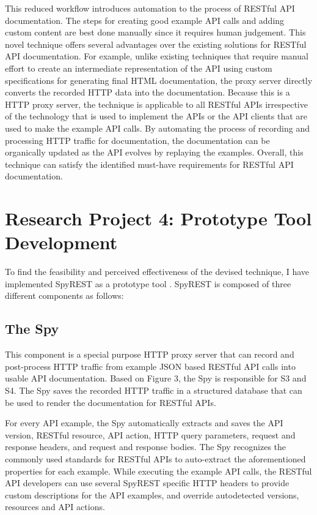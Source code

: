 \documentclass[11pt,oneside]{book}
\begin{document}
This reduced workflow introduces automation to the process of RESTful API documentation. The steps for creating good example API calls and adding custom content are best done manually since it requires human judgement. This novel technique offers several advantages over the existing solutions for RESTful API documentation. For example, unlike existing techniques that require manual effort to create an intermediate representation of the API using custom specifications for generating final HTML documentation, the proxy server directly converts the recorded HTTP data into the documentation. Because this is a HTTP proxy server, the technique is applicable to all RESTful APIs irrespective of the technology that is used to implement the APIs or the API clients that are used to make the example API calls. By automating the process of recording and processing HTTP traffic for documentation, the documentation can be organically updated as the API evolves by replaying the examples. Overall, this technique can satisfy the identified must-have requirements for RESTful API documentation.

\section{Research Project 4: Prototype Tool Development}

To find the feasibility and perceived effectiveness of the devised technique, I have implemented SpyREST as a prototype tool \cite{sohan2015spyrest_tool}. SpyREST is composed of three different components as follows:

\subsection{The Spy}
This component is a special purpose HTTP proxy server that can record and post-process HTTP traffic from example JSON based RESTful API calls into usable API documentation. Based on Figure 3, the Spy is responsible for S3 and S4. The Spy saves the recorded HTTP traffic in a structured database that can be used to render the documentation for RESTful APIs.

For every API example, the Spy automatically extracts and saves the API version, RESTful resource, API action, HTTP query parameters, request and response headers, and request and response bodies. The Spy recognizes the commonly used standards for RESTful APIs to auto-extract the aforementioned properties for each example. While executing the example API calls, the RESTful API developers can use several SpyREST specific HTTP headers to provide custom descriptions for the API examples, and override autodetected versions, resources and API actions.
\end{document}
